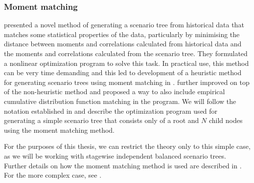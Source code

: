 \subsubsection{Moment matching}
\cite{hoyland_wallace_moment_matching} presented a novel method of generating a scenario tree from historical data that matches some statistical properties of the data, particularly by minimising the distance between moments and correlations calculated from historical data and the moments and correlations calculated from the scenario tree. They formulated a nonlinear optimization program to solve this task. In practical use, this method can be very time demanding and this led to development of a heuristic method for generating scenario trees using moment matching in \cite{hoyland_wallace_moment_matching_heuristic}.  \cite{moment_matching_agarwal} further improved on top of the non-heuristic method and proposed a way to also include empirical cumulative distribution function matching in the program. We will follow the notation established in \cite{moment_matching_agarwal} and describe the optimization program used for generating a simple scenario tree that consists only of a root and $N$ child nodes using the moment matching method.
\begin{rem}
For the purposes of this thesis, we can restrict the theory only to this simple case, as we will be working with stagewise independent balanced scenario trees. Further details on how the moment matching method is used are described in . For the more complex case, see \cite{hoyland_wallace_moment_matching}.
\end{rem}
